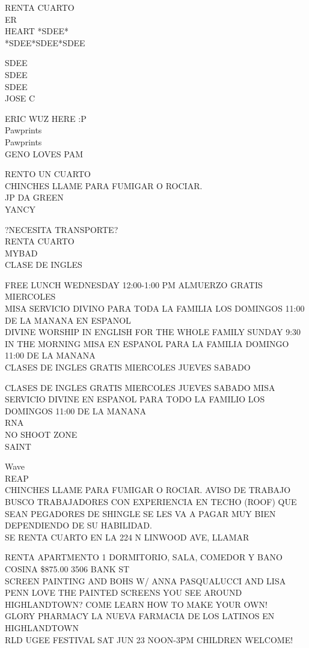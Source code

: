 \documentclass[10pt,letterpaper]{article}
\begin{document}
RENTA CUARTO\\
ER\\
HEART *SDEE*\\
*SDEE*SDEE*SDEE

SDEE\\
SDEE\\
SDEE\\
JOSE C

ERIC WUZ HERE :P\\
Pawprints\\
Pawprints\\
GENO LOVES PAM

RENTO UN CUARTO\\
CHINCHES LLAME PARA FUMIGAR O ROCIAR.\\
JP DA GREEN\\
YANCY

?NECESITA TRANSPORTE?\\
RENTA CUARTO\\
MYBAD\\
CLASE DE INGLES

FREE LUNCH WEDNESDAY 12:00{-}1:00 PM ALMUERZO GRATIS MIERCOLES\\
MISA SERVICIO DIVINO PARA TODA LA FAMILIA LOS DOMINGOS 11:00 DE LA MANANA EN ESPANOL\\
DIVINE WORSHIP IN ENGLISH FOR THE WHOLE FAMILY SUNDAY 9:30 IN THE MORNING MISA EN ESPANOL PARA LA FAMILIA DOMINGO 11:00 DE LA MANANA\\
CLASES DE INGLES GRATIS MIERCOLES JUEVES SABADO

CLASES DE INGLES GRATIS MIERCOLES JUEVES SABADO MISA SERVICIO DIVINE EN ESPANOL PARA TODO LA FAMILIO LOS DOMINGOS 11:00 DE LA MANANA\\
RNA\\
NO SHOOT ZONE\\
SAINT

Wave\\
REAP\\
CHINCHES LLAME PARA FUMIGAR O ROCIAR. AVISO DE TRABAJO BUSCO TRABAJADORES CON EXPERIENCIA EN TECHO (ROOF) QUE SEAN PEGADORES DE SHINGLE SE LES VA A PAGAR MUY BIEN DEPENDIENDO DE SU HABILIDAD.\\
SE RENTA CUARTO EN LA 224 N LINWOOD AVE, LLAMAR

RENTA APARTMENTO 1 DORMITORIO, SALA, COMEDOR Y BANO COSINA \$875.00 3506 BANK ST\\
SCREEN PAINTING AND BOHS W/ ANNA PASQUALUCCI AND LISA PENN LOVE THE PAINTED SCREENS YOU SEE AROUND HIGHLANDTOWN?  COME LEARN HOW TO MAKE YOUR OWN!\\
GLORY PHARMACY LA NUEVA FARMACIA DE LOS LATINOS EN HIGHLANDTOWN\\
RLD UGEE FESTIVAL SAT JUN 23 NOON{-}3PM CHILDREN WELCOME!
\end{document}

